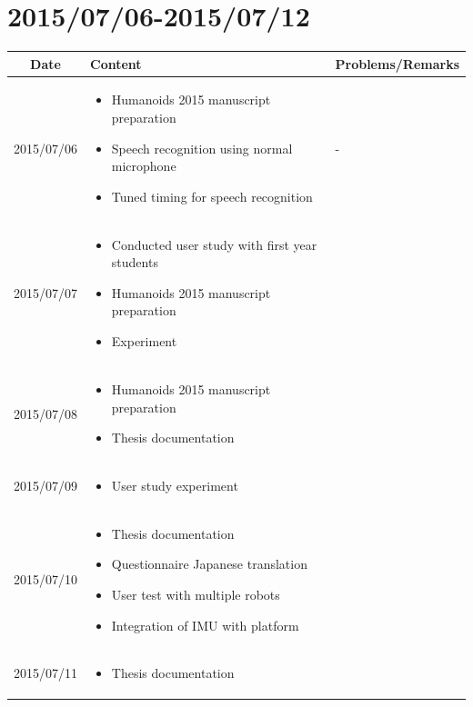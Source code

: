 \documentclass[11pt]{article} %
\begin{document}
\newpage
\section{2015/07/06-2015/07/12}

\begin{center}
    \begin{longtable}{ | c | p{6cm} | p{5cm} |}
    \hline
    Date & Content & Problems/Remarks \\ 
    \endhead
    \hline    
     2015/07/06         & 
  	\begin{itemize}
  	\item Humanoids 2015 manuscript preparation
  	\item Speech recognition using normal microphone
  	\item Tuned timing for speech recognition
	\end{itemize}  
   & - \\
\hline
  										 
 2015/07/07         & 
  \begin{itemize}
  \item Conducted user study with first year students
  \item Humanoids 2015 manuscript preparation
  \item Experiment 
\end{itemize}   
& 
 \\
\hline
  										 
  
  2015/07/08        & 
  \begin{itemize}
  \item Humanoids 2015 manuscript preparation
  \item Thesis documentation
  \end{itemize}   
  										 & 
 
  										 \\
  \hline
  
  2015/07/09         & 
  \begin{itemize}
  \item User study experiment
  \end{itemize}
  & 
\\  										 \hline

  2015/07/10         & 
  \begin{itemize}
  \item Thesis documentation
  \item Questionnaire Japanese translation
  \item User test with multiple robots
  \item Integration of IMU with platform
\end{itemize}   
  & 
\\  										 \hline						

  2015/07/11         & 
  \begin{itemize}
  \item Thesis documentation
  \end{itemize}   
  & 
\\  										 \hline								 							 
  										   								 
    \end{longtable}
\end{center}
\end{document}
